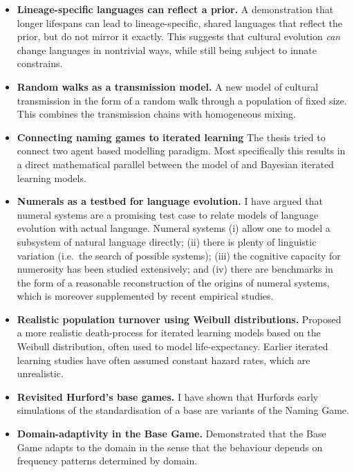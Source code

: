 \documentclass{../src/bcthesispart}
\begin{document}
\begin{itemize}		
	\item \textbf{Lineage-specific languages can reflect a prior.} 
		A demonstration that longer lifespans can lead to lineage-specific, shared languages that reflect the prior, but do not mirror it exactly. This suggests that cultural evolution \emph{can} change languages in nontrivial ways, while still being subject to innate constrains.
	
			
	\item \textbf{Random walks as a transmission model.}
		A new model of cultural transmission in the form of a random walk through a population of fixed size. 
		This combines the transmission chains with homogeneous mixing.

	\item \textbf{Connecting naming games to iterated learning}
	The thesis tried to connect two agent based modelling paradigm. Most specifically this results in a direct mathematical parallel between the model of \textcite{DeVylder2006} and Bayesian iterated learning models. 
	
	\item \textbf{Numerals as a testbed for language evolution.} 
		I have argued that numeral systems are a promising test case to relate models of language evolution with actual language.
		Numeral systems (i) allow one to model a subsystem of natural language directly; (ii) there is plenty of linguistic variation (i.e.\ the search of possible systems); (iii) the cognitive capacity for numerosity has been studied extensively; and (iv) there are benchmarks in the form of a reasonable reconstruction of the origins of numeral systems, which is moreover supplemented by recent empirical studies.
		
	\item \textbf{Realistic population turnover using Weibull distributions.}
		Proposed a more realistic death-process for iterated learning models based on the Weibull distribution, often used to model life-expectancy.
		Earlier iterated learning studies have often assumed constant hazard rates, which are unrealistic.
		
	\item \textbf{Revisited Hurford’s base games.}
		I have shown that Hurfords early simulations of the standardisation of a base are variants of the Naming Game.
		
	\item \textbf{Domain-adaptivity in the Base Game.}
		Demonstrated that the Base Game adapts to the domain in the sense that the behaviour depends on frequency patterns determined by domain.
		

\end{itemize}
\end{document}
